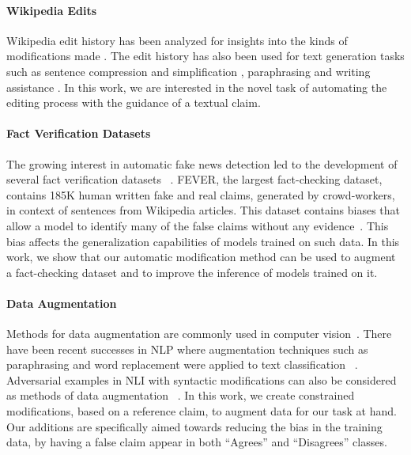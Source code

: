 \documentclass[letterpaper]{article}
\begin{document}
\paragraph{Wikipedia Edits}
Wikipedia edit history has been analyzed for insights into the kinds of modifications made
\cite{daxenberger-gurevych-2013-automatically,yang-etal-2017-identifying-semantic,faruqui-etal-2018-wikiatomicedits}. The edit history has also been used for text generation tasks such as sentence compression and simplification
\cite{yatskar-etal-2010-sake}, paraphrasing \cite{max-wisniewski-2010-mining} and writing assistance
\cite{cahill-etal-2013-robust}. In this work, we are interested in the novel task of automating the editing process with the guidance of a textual claim.

\paragraph{Fact Verification Datasets}

The growing interest in automatic fake news detection led to the development of several fact verification datasets
~\cite{vlachos-riedel-2014-fact,wang-2017-liar,rashkin-etal-2017-truth,fever}. FEVER, the largest fact-checking dataset, contains 185K human written fake and real claims, generated by crowd-workers, in context of sentences from Wikipedia articles.
This dataset contains biases that allow a model to identify many of the false claims without any evidence~\cite{schuster2019towards}.
This bias affects the generalization capabilities of models trained on such data.
In this work, we show that our automatic modification method can be used to augment a fact-checking dataset and to improve the inference of models trained on it.




\paragraph{Data Augmentation}
Methods for data augmentation are commonly used in computer vision~\cite{perez2017effectiveness}. There have been recent successes in NLP where augmentation techniques such as paraphrasing and word replacement were applied to text classification ~\cite{kobayashi2018contextual,wu2018conditional}. Adversarial examples in NLI with syntactic modifications can also be considered as methods of data augmentation ~\cite{iyyer-etal-2018-adversarial,zhang2019paws}.
 In this work, we create constrained modifications, based on a reference claim, to augment data for our task at hand. Our additions are specifically aimed towards reducing the bias in the training data, by having a false claim appear in both ``Agrees'' and ``Disagrees'' classes.
\end{document}
